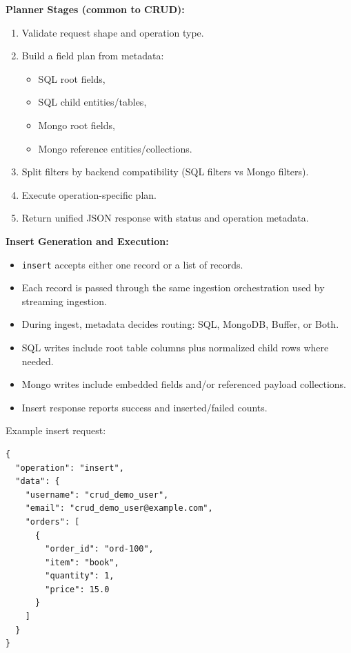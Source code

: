 \documentclass[12pt,a4paper]{article}
\begin{document}
\textbf{Planner Stages (common to CRUD):}
\begin{enumerate}[leftmargin=*]
  \item Validate request shape and operation type.
  \item Build a field plan from metadata:
  \begin{itemize}[leftmargin=*]
    \item SQL root fields,
    \item SQL child entities/tables,
    \item Mongo root fields,
    \item Mongo reference entities/collections.
  \end{itemize}
  \item Split filters by backend compatibility (SQL filters vs Mongo filters).
  \item Execute operation-specific plan.
  \item Return unified JSON response with status and operation metadata.
\end{enumerate}

\textbf{Insert Generation and Execution:}
\begin{itemize}[leftmargin=*]
  \item \texttt{insert} accepts either one record or a list of records.
  \item Each record is passed through the same ingestion orchestration used by streaming ingestion.
  \item During ingest, metadata decides routing: SQL, MongoDB, Buffer, or Both.
  \item SQL writes include root table columns plus normalized child rows where needed.
  \item Mongo writes include embedded fields and/or referenced payload collections.
  \item Insert response reports success and inserted/failed counts.
\end{itemize}

Example insert request:
\begin{lstlisting}[style=jsonstyle]
{
  "operation": "insert",
  "data": {
    "username": "crud_demo_user",
    "email": "crud_demo_user@example.com",
    "orders": [
      {
        "order_id": "ord-100",
        "item": "book",
        "quantity": 1,
        "price": 15.0
      }
    ]
  }
}
\end{lstlisting}
\end{document}
